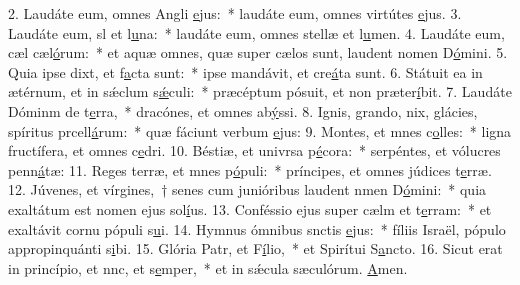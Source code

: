 2. Laudáte eum, omnes Angli \uline{e}jus:~* laudáte eum, omnes virtútes \uline{e}jus.
3. Laudáte eum, sl et l\uline{u}na:~* laudáte eum, omnes stellæ et l\uline{u}men.
4. Laudáte eum, cæl cæl\uline{ó}rum:~* et aquæ omnes, quæ super cælos sunt, laudent nomen D\uline{ó}mini.
5. Quia ipse dixt, et f\uline{a}cta sunt:~* ipse mandávit, et cre\uline{á}ta sunt.
6. Státuit ea in ætérnum, et in sǽclum s\uline{ǽ}culi:~* præcéptum pósuit, et non præter\uline{í}bit.
7. Laudáte Dóminm de t\uline{e}rra,~* dracónes, et omnes ab\uline{ý}ssi.
8. Ignis, grando, nix, glácies, spíritus prcell\uline{á}rum:~* quæ fáciunt verbum \uline{e}jus:
9. Montes, et mnes c\uline{o}lles:~* ligna fructífera, et omnes c\uline{e}dri.
10. Béstiæ, et univrsa p\uline{é}cora:~* serpéntes, et vólucres penn\uline{á}tæ:
11. Reges terræ, et mnes p\uline{ó}puli:~* príncipes, et omnes júdices t\uline{e}rræ.
12. Júvenes, et vírgines,~† senes cum junióribus laudent nmen D\uline{ó}mini:~* quia exaltátum est nomen ejus sol\uline{í}us.
13. Conféssio ejus super cælm et t\uline{e}rram:~* et exaltávit cornu pópuli s\uline{u}i.
14. Hymnus ómnibus snctis \uline{e}jus:~* fíliis Israël, pópulo appropinquánti s\uline{i}bi.
15. Glória Patr, et F\uline{í}lio,~* et Spirítui S\uline{a}ncto.
16. Sicut erat in princípio, et nnc, et s\uline{e}mper,~* et in sǽcula sæculórum. \uline{A}men.
